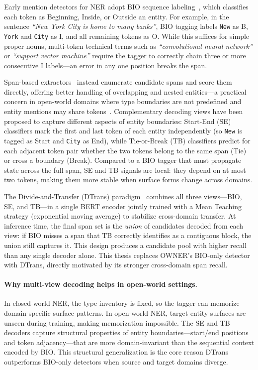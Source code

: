 \documentclass[14pt]{extreport}
\begin{document}
Early mention detectors for NER adopt BIO sequence labeling~\cite{ma-hovy-2016-end}, which classifies each token as Beginning, Inside, or Outside an entity. For example, in the sentence \textit{``New York City is home to many banks''}, BIO tagging labels \texttt{New} as B, \texttt{York} and \texttt{City} as I, and all remaining tokens as O. While this suffices for simple proper nouns, multi-token technical terms such as \textit{``convolutional neural network''} or \textit{``support vector machine''} require the tagger to correctly chain three or more consecutive I labels---an error in any one position breaks the span.

Span-based extractors~\cite{zhong-chen-2021-frustratingly} instead enumerate candidate spans and score them directly, offering better handling of overlapping and nested entities---a practical concern in open-world domains where type boundaries are not predefined and entity mentions may share tokens~\cite{li-etal-2020-unified}. Complementary decoding views have been proposed to capture different aspects of entity boundaries: Start-End (SE) classifiers mark the first and last token of each entity independently (so \texttt{New} is tagged as Start and \texttt{City} as End), while Tie-or-Break (TB) classifiers predict for each adjacent token pair whether the two tokens belong to the same span (Tie) or cross a boundary (Break). Compared to a BIO tagger that must propagate state across the full span, SE and TB signals are local: they depend on at most two tokens, making them more stable when surface forms change across domains.

The Divide-and-Transfer (DTrans) paradigm~\cite{zhang-etal-2024-dtrans} combines all three views---BIO, SE, and TB---in a single BERT encoder jointly trained with a Mean Teaching strategy (exponential moving average) to stabilize cross-domain transfer. At inference time, the final span set is the \emph{union} of candidates decoded from each view: if BIO misses a span that TB correctly identifies as a contiguous block, the union still captures it. This design produces a candidate pool with higher recall than any single decoder alone. This thesis replaces OWNER’s BIO-only detector with DTrans, directly motivated by its stronger cross-domain span recall.

\paragraph{Why multi-view decoding helps in open-world settings.}
In closed-world NER, the type inventory is fixed, so the tagger can memorize domain-specific surface patterns. In open-world NER, target entity surfaces are unseen during training, making memorization impossible. The SE and TB decoders capture structural properties of entity boundaries---start/end positions and token adjacency---that are more domain-invariant than the sequential context encoded by BIO. This structural generalization is the core reason DTrans outperforms BIO-only detectors when source and target domains diverge.
\end{document}
